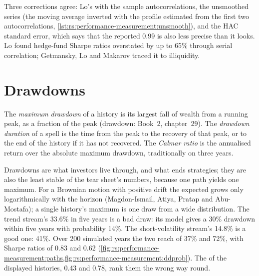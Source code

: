 Three corrections agree: Lo's  with the sample autocorrelations, the unsmoothed series (the moving average inverted with the profile estimated
from the first two autocorrelations, \cref{lst:rs:performance-measurement:unsmooth}), and the HAC standard error, which says that the reported 0.99 is also
less precise than it looks. Lo found hedge-fund Sharpe ratios overstated by up to 65\% through serial correlation; Getmansky, Lo and Makarov traced it to
illiquidity.

\section{Drawdowns}

\begin{definition}\label{def:rs:performance-measurement:drawdown}
The \emph{maximum drawdown} of a history is its largest fall of wealth from a running peak, as a fraction of the peak (drawdown: Book~2,
chapter~29). The \emph{drawdown duration} of a spell is the time from the peak to the recovery of that peak, or to the end of the history
if it has not recovered. The \emph{Calmar ratio} is the annualised return over the absolute maximum drawdown, traditionally on three years.
\end{definition}

Drawdowns are what investors live through, and what ends strategies; they are also the least stable of the tear sheet's numbers, because one path yields one
maximum. For a Brownian motion with positive drift the expected  grows only logarithmically with the horizon (Magdon-Ismail, Atiya, Pratap and
Abu-Mostafa); a single history's maximum is one draw from a wide distribution. The trend stream's 33.6\% in five years is a bad draw: its model gives a 30\%
drawdown within five years with probability 14\%. The short-volatility stream's 14.8\% is a good one: 41\%. Over 200 simulated years the two reach  of 37\% and 72\%, with Sharpe ratios of 0.83 and 0.62 (\cref{fig:rs:performance-measurement:paths,fig:rs:performance-measurement:ddprob}). The  of the displayed histories, 0.43 and 0.78, rank them the wrong way round.

